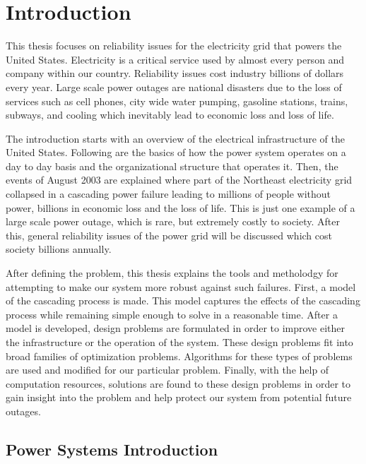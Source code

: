 \newcommand{\mypath}{../thesis}
\chapter{Introduction}
This thesis focuses on reliability issues for the electricity grid that powers the United States.  Electricity is a critical service used by almost every person and company within our country.  Reliability issues cost industry billions of dollars every year.  Large scale power outages are national disasters due to the loss of services such as cell phones, city wide water pumping, gasoline stations, trains, subways, and cooling which inevitably lead to economic loss and loss of life.  

The introduction starts with an overview of the electrical infrastructure of the United States.  Following are the basics of how the power system operates on a day to day basis and the organizational structure that operates it. Then, the events of August 2003 are explained where part of the Northeast electricity grid collapsed in a cascading power failure leading to millions of people without power, billions in economic loss and the loss of life.  This is just one example of a large scale power outage, which is rare, but extremely costly to society. After this, general reliability issues of the power grid will be discussed which cost society billions annually.
 
After defining the problem, this thesis explains the tools and metholodgy for attempting to make our system more robust against such failures.  First, a model of the cascading process is made.  This model captures the effects of the cascading process while remaining simple enough to solve in a reasonable time.  After a model is developed, design problems are formulated in order to improve either the infrastructure or the operation of the system.  These design problems fit into broad families of optimization problems.  Algorithms for these types of problems are used and modified for our particular problem.  Finally, with the help of computation resources, solutions are found to these design problems in order to gain insight into the problem and help protect our system from potential future outages.

\section{Power Systems Introduction}


